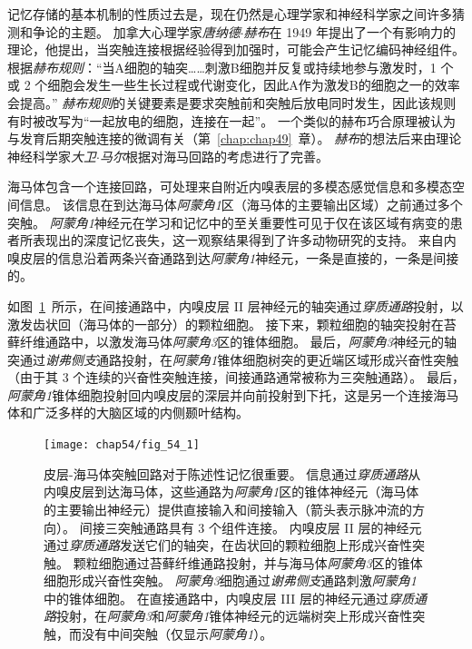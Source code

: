 记忆存储的基本机制的性质过去是，现在仍然是心理学家和神经科学家之间许多猜测和争论的主题。
加拿大心理学家\textit{唐纳德$\cdot$赫布}在 1949 年提出了一个有影响力的理论，他提出，当突触连接根据经验得到加强时，可能会产生记忆编码神经组件。
根据\textit{赫布规则}：“当A细胞的轴突……刺激B细胞并反复或持续地参与激发时，1 个或 2 个细胞会发生一些生长过程或代谢变化，因此A作为激发B的细胞之一的效率会提高。”
\textit{赫布规则}的关键要素是要求突触前和突触后放电同时发生，因此该规则有时被改写为“一起放电的细胞，连接在一起”。
一个类似的赫布巧合原理被认为与发育后期突触连接的微调有关（第~\ref{chap:chap49}~章）。
\textit{赫布}的想法后来由理论神经科学家\textit{大卫$\cdot$马尔}根据对海马回路的考虑进行了完善。


海马体包含一个连接回路，可处理来自附近内嗅表层的多模态感觉信息和多模态空间信息。
该信息在到达海马体\textit{阿蒙角1}区（海马体的主要输出区域）之前通过多个突触。
\textit{阿蒙角1}神经元在学习和记忆中的至关重要性可见于仅在该区域有病变的患者所表现出的深度记忆丧失，这一观察结果得到了许多动物研究的支持。
来自内嗅皮层的信息沿着两条兴奋通路到达\textit{阿蒙角1}神经元，一条是直接的，一条是间接的。


如图~\ref{fig:54_1}~所示，在间接通路中，内嗅皮层 II 层神经元的轴突通过\textit{穿质通路}投射，以激发齿状回（海马体的一部分）的颗粒细胞。
接下来，颗粒细胞的轴突投射在苔藓纤维通路中，以激发海马体\textit{阿蒙角3}区的锥体细胞。
最后，\textit{阿蒙角3}神经元的轴突通过\textit{谢弗侧支}通路投射，在\textit{阿蒙角1}锥体细胞树突的更近端区域形成兴奋性突触（由于其 3 个连续的兴奋性突触连接，间接通路通常被称为三突触通路）。
最后，\textit{阿蒙角1}锥体细胞投射回内嗅皮层的深层并向前投射到下托，这是另一个连接海马体和广泛多样的大脑区域的内侧颞叶结构。


\begin{figure}[htbp]
	\centering
	\texttt{[image: chap54/fig\_54\_1]}
	\caption{皮层-海马体突触回路对于陈述性记忆很重要。
		信息通过\textit{穿质通路}从内嗅皮层到达海马体，这些通路为\textit{阿蒙角1}区的锥体神经元（海马体的主要输出神经元）提供直接输入和间接输入（箭头表示脉冲流的方向）。
		间接三突触通路具有 3 个组件连接。
		内嗅皮层 II 层的神经元通过\textit{穿质通路}发送它们的轴突，在齿状回的颗粒细胞上形成兴奋性突触。
		颗粒细胞通过苔藓纤维通路投射，并与海马体\textit{阿蒙角3}区的锥体细胞形成兴奋性突触。
		\textit{阿蒙角3}细胞通过\textit{谢弗侧支}通路刺激\textit{阿蒙角1}中的锥体细胞。
		在直接通路中，内嗅皮层 III 层的神经元通过\textit{穿质通路}投射，在\textit{阿蒙角3}和\textit{阿蒙角1}锥体神经元的远端树突上形成兴奋性突触，而没有中间突触（仅显示\textit{阿蒙角1}）。}
	\label{fig:54_1}
\end{figure}


